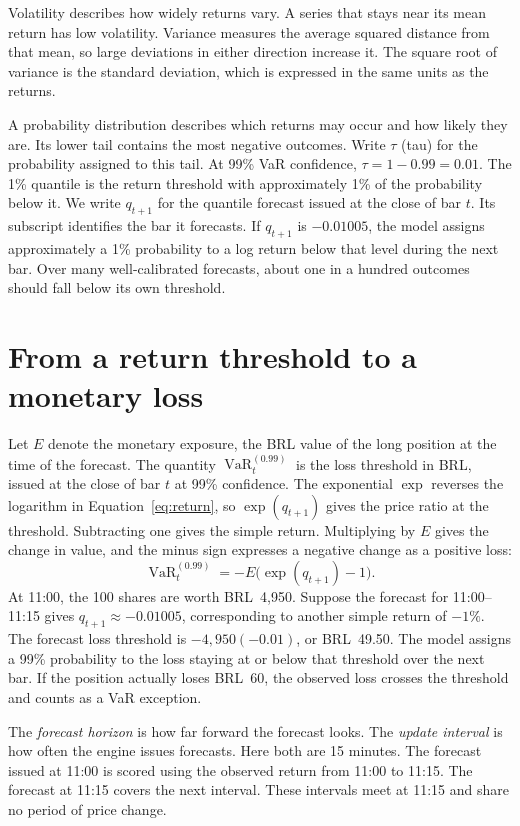 \documentclass[
	12pt,				%
	openright,			%
	twoside,			%
	a4paper,
	chapter=TITLE,
	english				%
	]{abntex2}
\begin{document}
Volatility describes how widely returns vary. A series that stays near its mean return has low volatility. Variance measures the average squared distance from that mean, so large deviations in either direction increase it. The square root of variance is the standard deviation, which is expressed in the same units as the returns.

A probability distribution describes which returns may occur and how likely they are. Its lower tail contains the most negative outcomes. Write $\tau$ (tau) for the probability assigned to this tail. At 99\% VaR confidence, $\tau=1-0.99=0.01$. The 1\% quantile is the return threshold with approximately 1\% of the probability below it. We write $q_{t+1}$ for the quantile forecast issued at the close of bar $t$. Its subscript identifies the bar it forecasts. If $q_{t+1}$ is $-0.01005$, the model assigns approximately a 1\% probability to a log return below that level during the next bar. Over many well-calibrated forecasts, about one in a hundred outcomes should fall below its own threshold.

\section{From a return threshold to a monetary loss}

Let $E$ denote the monetary exposure, the BRL value of the long position at the time of the forecast. The quantity $\operatorname{VaR}_{t}^{(0.99)}$ is the loss threshold in BRL, issued at the close of bar $t$ at 99\% confidence. The exponential $\exp$ reverses the logarithm in Equation~\ref{eq:return}, so $\exp(q_{t+1})$ gives the price ratio at the threshold. Subtracting one gives the simple return. Multiplying by $E$ gives the change in value, and the minus sign expresses a negative change as a positive loss:
\begin{equation}
  \operatorname{VaR}_{t}^{(0.99)} = -E\bigl(\exp(q_{t+1})-1\bigr).
  \label{eq:var}
\end{equation}
At 11:00, the 100 shares are worth BRL~4,950. Suppose the forecast for 11:00--11:15 gives $q_{t+1}\approx-0.01005$, corresponding to another simple return of $-1\%$. The forecast loss threshold is $-4{,}950(-0.01)$, or BRL~49.50. The model assigns a 99\% probability to the loss staying at or below that threshold over the next bar. If the position actually loses BRL~60, the observed loss crosses the threshold and counts as a VaR exception.

The \emph{forecast horizon} is how far forward the forecast looks. The \emph{update interval} is how often the engine issues forecasts. Here both are 15 minutes. The forecast issued at 11:00 is scored using the observed return from 11:00 to 11:15. The forecast at 11:15 covers the next interval. These intervals meet at 11:15 and share no period of price change.
\end{document}
